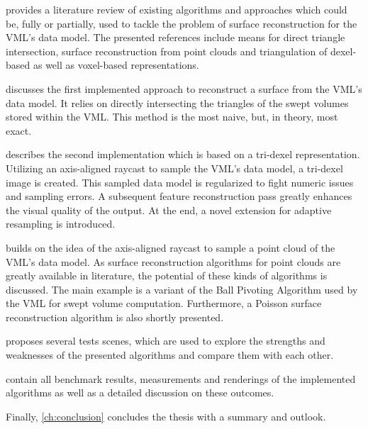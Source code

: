  provides a literature review of existing algorithms and approaches which could be, fully or partially, used to tackle the problem of surface reconstruction for the VML's data model.
The presented references include means for direct triangle intersection, surface reconstruction from point clouds and triangulation of dexel-based as well as voxel-based representations.

 discusses the first implemented approach to reconstruct a surface from the VML's data model.
It relies on directly intersecting the triangles of the swept volumes stored within the VML.
This method is the most naive, but, in theory, most exact.

 describes the second implementation which is based on a tri-dexel representation.
Utilizing an axis-aligned raycast to sample the VML's data model, a tri-dexel image is created.
This sampled data model is regularized to fight numeric issues and sampling errors.
A subsequent feature reconstruction pass greatly enhances the visual quality of the output.
At the end, a novel extension for adaptive resampling is introduced.

 builds on the idea of the axis-aligned raycast to sample a point cloud of the VML's data model.
As surface reconstruction algorithms for point clouds are greatly available in literature, the potential of these kinds of algorithms is discussed.
The main example is a variant of the Ball Pivoting Algorithm used by the VML for swept volume computation.
Furthermore, a Poisson surface reconstruction algorithm is also shortly presented.

 proposes several tests scenes, which are used to explore the strengths and weaknesses of the presented algorithms and compare them with each other.

 contain all benchmark results, measurements and renderings of the implemented algorithms as well as a detailed discussion on these outcomes.

Finally, \cref{ch:conclusion} concludes the thesis with a summary and outlook.
